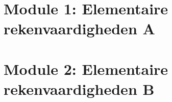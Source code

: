 \documentclass[11pt]{article}
\begin{document}
\section{Module 1: Elementaire rekenvaardigheden A}
%
%
%
%

%
\section{Module 2: Elementaire rekenvaardigheden B}







%
%
\end{document}
